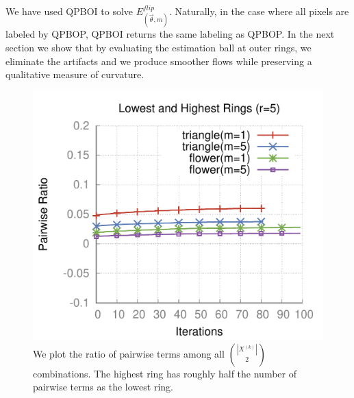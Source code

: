   We have used QPBOI to solve $E_{(\vec{\theta},m)}^{flip}$. Naturally, in the case where all pixels are labeled by QPBOP, QPBOI returns the same labeling as QPBOP. In the next section we show that by evaluating the estimation ball at outer rings, we eliminate the artifacts and we produce smoother flows while preserving a qualitative measure of curvature.


\begin{figure}
\center
\includegraphics[scale=0.5]{figures/chapter6/unlabeled-ratio/plots/pairwise-ratio/h0.25/radius-5/plot-pairwiseratio-lowerHigher-concavities-probe.pdf}
\caption{We plot the ratio of pairwise terms among all $\binom{|X^{(k)}|}{2}$ combinations. The highest ring has roughly half the number of pairwise terms as the lowest ring.}
\label{fig:ratio-pairwise-terms}
\end{figure}


